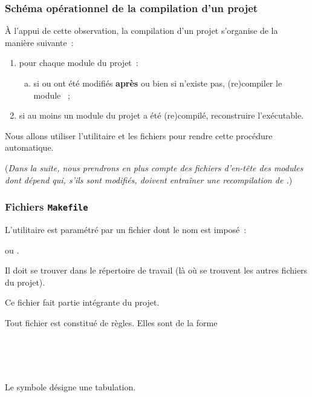 \begin{frame}[fragile]
\frametitle{Schéma opérationnel de la compilation d'un projet}
À l'appui de cette observation, la compilation d'un projet
s'organise de la manière suivante~:
\smallskip

\begin{enumerate}[(1)]
    \item pour chaque module  du projet~:
    \begin{enumerate}[(a)] \normalsize
        \item si  ou  ont été modifiés {\bf après}
         ou bien si  n'existe pas, (re)compiler le
        module ~;
    \end{enumerate}
    \item si au moins un module du projet a été (re)compilé, reconstruire
    l'exécutable.
\end{enumerate}
\bigskip

Nous allons utiliser l'utilitaire \alert{} et les fichiers
\alert{} pour rendre cette procédure automatique.
\bigskip
\bigskip

({\it Dans la suite, nous prendrons en plus compte des fichiers
d'en-tête des modules dont dépend  qui, s'ils sont modifiés,
doivent entraîner une recompilation de .})
\end{frame}

\begin{frame}[fragile]
\frametitle{Fichiers {\tt Makefile}}
L'utilitaire  est paramétré par un fichier dont le nom est
imposé~:
\begin{center}
    \og {} \fg{} ou \og {} \fg.
\end{center}
Il doit se trouver dans le répertoire de travail (là où se trouvent les
autres fichiers du projet).
\medskip

Ce fichier fait partie intégrante du projet.
\bigskip

Tout fichier  est constitué de \alert{règles}.
Elles sont de la forme
\smallskip

 \\
 \\
\Code{\vdots} \\
\bigskip

Le symbole \og\Code{$\rightarrow$}\fg{} désigne une tabulation.
\end{frame}


